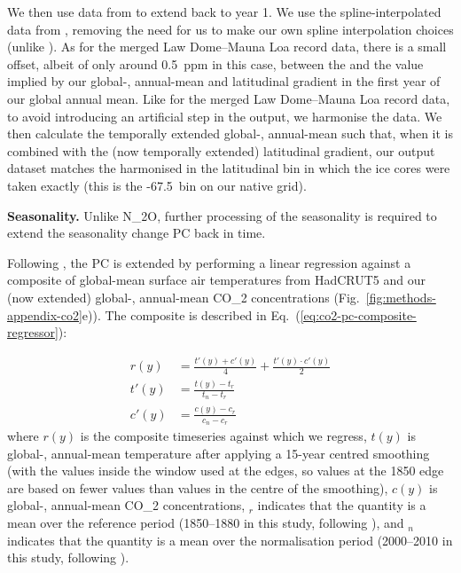 We then use data from \citet{menking_law-dome_2025} to extend back to year 1.
We use the spline-interpolated data from \citet{menking_law-dome_2025},
removing the need for us to make our own spline interpolation choices (unlike \citet{meinshausen_historical-ghgs_2017}).
As for the merged Law Dome--Mauna Loa record data,
there is a small offset, albeit of only around 0.5~ppm in this case,
between the \citet{menking_law-dome_2025}
and the value implied by our global-, annual-mean and latitudinal gradient
in the first year of our global annual mean.
Like for the merged Law Dome--Mauna Loa record data,
to avoid introducing an artificial step in the output,
we harmonise the \citet{menking_law-dome_2025} data.
We then calculate the temporally extended global-, annual-mean such that,
when it is combined with the (now temporally extended) latitudinal gradient,
our output dataset matches the harmonised \citet{menking_law-dome_2025}
in the latitudinal bin in which the ice cores were taken exactly
(this is the -67.5\textdegree~bin on our native grid).

\textbf{Seasonality.}
Unlike N_2O, further processing of the seasonality is required to
extend the seasonality change PC back in time.

Following \cite{meinshausen_historical-ghgs_2017},
the PC is extended by performing a linear regression against a composite of global-mean surface air temperatures from HadCRUT5 \citep[version 5.0.2.0,][]{morice_hadcrut5_2021,met-office_hadcrut5-data_2025}
and our (now extended) global-, annual-mean CO_2 concentrations (Fig.~\ref{fig:methods-appendix-co2}e)).
The composite is described in Eq.~(\ref{eq:co2-pc-composite-regressor}):

\begin{align}
    \label{eq:co2-pc-composite-regressor}
    r(y) &= \frac{t'(y) + c'(y)}{4} + \frac{t'(y) \cdot c'(y)}{2} \\
    t'(y) &= \frac{t(y) - t_r}{t_n - t_r}  \\
    c'(y) &= \frac{c(y) - c_r}{c_n - c_r}
\end{align}
where $r(y)$ is the composite timeseries against which we regress,
$t(y)$ is global-, annual-mean temperature after applying a 15-year centred smoothing
(with the values inside the window used at the edges, so values at the 1850 edge are based on fewer values than values in the centre of the smoothing),
$c(y)$ is global-, annual-mean CO_2 concentrations,
$_r$ indicates that the quantity is a mean over the reference period (1850--1880 in this study, following \citet{meinshausen_historical-ghgs_2017}),
and $_n$ indicates that the quantity is a mean over the normalisation period (2000--2010 in this study, following \citet{meinshausen_historical-ghgs_2017}).

